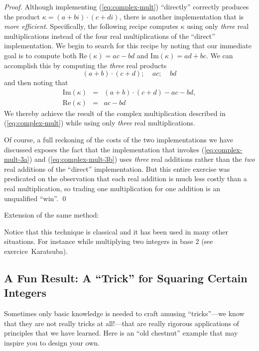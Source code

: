 \begin{proof}
Although implementing (\ref{eq:complex-mult}) ``directly'' correctly
produces the product $\kappa = (a+bi) \cdot (c+di)$, there is another
implementation that is {\em more efficient}.  Specifically, the
following recipe computes $\kappa$ using only {\em three} real
multiplications instead of the four real multiplications of the
``direct'' implementation.  We begin to search for this recipe by
noting that our immediate goal is to compute both Re$(\kappa) = ac-bd$
and Im$(\kappa) = ad+bc$.  We can accomplish this by computing the
{\em three} real products
\begin{equation}
\label{eq:complex-mult-3a}
(a+b) \cdot (c+d); \ \ \ \ \
ac;  \ \ \ \ \ bd
\end{equation}
and then noting that
\begin{equation}
\label{eq:complex-mult-3b}
\begin{array}{lcl}
\mbox{Im}(\kappa) & = & (a+b) \cdot (c+d) - ac -bd, \\
\mbox{Re}(\kappa) & = & ac -bd
\end{array}
\end{equation}
We thereby achieve the result of the complex multiplication described
in (\ref{eq:complex-mult}) while using only {\em three} real
multiplications.

Of course, a full reckoning of the costs of the two implementations we
have discussed exposes the fact that the implementation that invokes
(\ref{eq:complex-mult-3a}) and (\ref{eq:complex-mult-3b}) uses {\em
  three} real additions rather than the {\em two} real additions of
the ``direct'' implementation.  But this entire exercise was
predicated on the observation that each real addition is much less
costly than a real multiplication, so trading one multiplication for
one addition is an unqualified ``win''.  \qed
\end{proof}

Extension of the same method: 

Notice that this technique is classical and it has been used in many other situations.
For instance while multiplying two integers in base 2 (see exercice~{Karatsuba}).




\subsection{A Fun Result: A ``Trick'' for Squaring Certain Integers}

Sometimes only basic knowledge is needed to craft amusing
``tricks''---we know that they are not really tricks at all!---that
are really rigorous applications of principles that we have learned.
Here is an ``old chestnut'' example that may inspire you to design
your own. 

